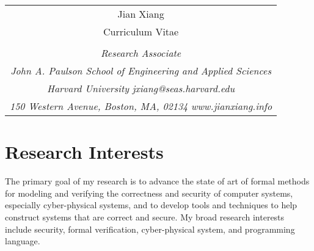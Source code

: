 \documentclass[11pt]{article}
\begin{document}
\renewcommand{\baselinestretch}{1.2} 

\pagestyle{empty} 


\begin{tabularx}{\linewidth}{@{} C @{}}
\Huge{\textsf{Jian Xiang}} \\[7.5pt]
Curriculum Vitae  \\
\\
\noindent \textit{Research Associate} \hfill { } \\
\noindent \textit{John A. Paulson School of Engineering and Applied Sciences} \hfill { } \\
\noindent \textit{Harvard University}     \hfill \textit{jxiang@seas.harvard.edu}  \\
\noindent \textit{150 Western Avenue, Boston, MA, 02134} \hfill \textit{www.jianxiang.info}
\end{tabularx}

\vspace{4mm}


\section{Research Interests}

The primary goal of my research is to advance the state of art of formal methods for modeling and verifying the correctness and security of computer systems, especially cyber-physical systems, and to develop tools and techniques to help construct systems that are correct and secure.
%
My broad research interests include security, formal verification, cyber-physical system, and programming language.

%
%
\end{document}
